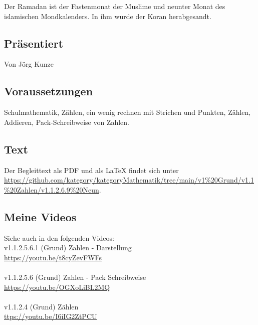 \documentclass[a4paper]{amsart}
\theoremstyle{definition}
\begin{document}
Der Ramadan ist der Fastenmonat der Muslime und neunter 
Monat des islamischen Mondkalenders. In ihm wurde der Koran herabgesandt.

\subsection*{Präsentiert}
Von Jörg Kunze

\subsection*{Voraussetzungen}
Schulmathematik, Zählen, ein wenig rechnen mit Strichen und Punkten, Zählen, Addieren, Pack-Schreibweise von Zahlen.

\subsection*{Text}
Der Begleittext als PDF und als LaTeX findet sich unter
\url{https://github.com/kategory/kategoryMathematik/tree/main/v1%20Grund/v1.1%20Zahlen/v1.1.2.6.9%20Neun}.

\subsection*{Meine Videos}
Siehe auch in den folgenden Videos:\\
v1.1.2.5.6.1 (Grund) Zahlen - Darstellung\\
\url{https://youtu.be/t8cyZevFWFs}\\
\\
v1.1.2.5.6 (Grund) Zahlen - Pack Schreibweise\\
\url{https://youtu.be/OGXoLiBL2MQ}\\
\\
v1.1.2.4 (Grund) Zählen\\
\url{ttps://youtu.be/I6iIG2ZtPCU}\\
\end{document}
